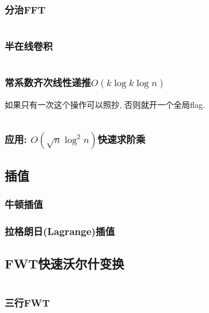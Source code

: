 \documentclass[a4paper, twoside]{article}
\begin{document}
\begin{multicols}{2}
				\subsubsection{分治FFT}
					\inputminted{cpp}{../src/math/分治FFT.cpp}

				\subsubsection{半在线卷积}
					\inputminted{cpp}{../src/math/半在线卷积.cpp}
				
				\subsubsection{常系数齐次线性递推$O(k\log k\log n)$}
					如果只有一次这个操作可以照抄, 否则就开一个全局flag.
					\inputminted{cpp}{../src/math/常系数齐次线性递推.cpp}
				
				\subsubsection{应用: $O(\sqrt n \log^2 n)$快速求阶乘}
					\label{fastfact}
					

			\subsection{插值}
				\subsubsection{牛顿插值}
					

				\subsubsection{拉格朗日(Lagrange)插值}
					
				

			\subsection{FWT快速沃尔什变换}
				\inputminted{cpp}{../src/math/FWT.cpp}

				\subsubsection{三行FWT}
					\inputminted{cpp}{../src/math/fwt3.cpp}


\end{multicols}
\end{document}

